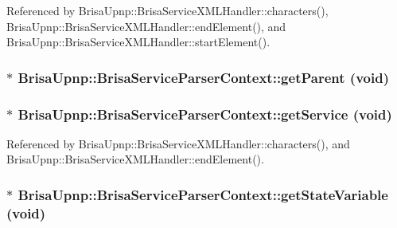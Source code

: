 Referenced by BrisaUpnp::BrisaServiceXMLHandler::characters(), BrisaUpnp::BrisaServiceXMLHandler::endElement(), and BrisaUpnp::BrisaServiceXMLHandler::startElement().\hypertarget{classBrisaUpnp_1_1BrisaServiceParserContext_a1f8f19cd9e7a5708495bb30ddce78508}{
\subsubsection[{getParent}]{$\ast$ BrisaUpnp::BrisaServiceParserContext::getParent (void)}}
\label{classBrisaUpnp_1_1BrisaServiceParserContext_a1f8f19cd9e7a5708495bb30ddce78508}
\hypertarget{classBrisaUpnp_1_1BrisaServiceParserContext_a6811e64f743078ec23c7d0b567b97fc7}{
\subsubsection[{getService}]{$\ast$ BrisaUpnp::BrisaServiceParserContext::getService (void)}}
\label{classBrisaUpnp_1_1BrisaServiceParserContext_a6811e64f743078ec23c7d0b567b97fc7}


Referenced by BrisaUpnp::BrisaServiceXMLHandler::characters(), and BrisaUpnp::BrisaServiceXMLHandler::endElement().\hypertarget{classBrisaUpnp_1_1BrisaServiceParserContext_a605c6cee63de3e7af556f8062b87b809}{
\subsubsection[{getStateVariable}]{$\ast$ BrisaUpnp::BrisaServiceParserContext::getStateVariable (void)}}
\label{classBrisaUpnp_1_1BrisaServiceParserContext_a605c6cee63de3e7af556f8062b87b809}


